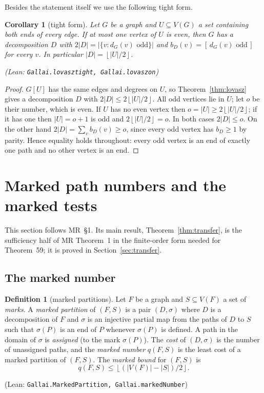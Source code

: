 \documentclass[11pt]{amsart}
\newtheorem{corollary}[theorem]{Corollary}
\theoremstyle{definition}
\newtheorem{definition}[theorem]{Definition}
\theoremstyle{remark}
\renewcommand{\_}{\oldunderscore\allowbreak}
\newcommand{\leanst}[1]{\par{\raggedright\small\textup{(Lean: \texttt{#1})}\par}}
\newcommand{\fl}[1]{\left\lfloor #1\right\rfloor}
\newcommand{\ind}[1]{[\,#1\,]}
\begin{document}
Besides the statement itself we use the following tight form.

\begin{corollary}[tight form]\label{cor:lovasz}
Let $G$ be a graph and $U\subseteq V(G)$ a set containing both ends of every edge. If at most one
vertex of $U$ is even, then $G$ has a decomposition $D$ with $2|D|=|\{v:d_G(v)\text{ odd}\}|$ and
$b_D(v)=\ind{d_G(v)\text{ odd}}$ for every $v$. In particular $|D|=\fl{|U|/2}$.
\leanst{Gallai.lovasz\_tight, Gallai.lovasz\_on}
\end{corollary}

\begin{proof}
$G[U]$ has the same edges and degrees on $U$, so Theorem~\ref{thm:lovasz} gives a decomposition $D$
with $2|D|\le 2\fl{|U|/2}$. All odd vertices lie in $U$; let $o$ be their number, which is even. If
$U$ has no even vertex then $o=|U|\ge 2\fl{|U|/2}$; if it has one then $|U|=o+1$ is odd and
$2\fl{|U|/2}=o$. In both cases $2|D|\le o$. On the other hand $2|D|=\sum_v b_D(v)\ge o$, since every
odd vertex has $b_D\ge1$ by parity. Hence equality holds throughout: every odd vertex is an end of
exactly one path and no other vertex is an end.
\end{proof}

\section{Marked path numbers and the marked tests}\label{sec:marked}

This section follows MR~\S1. Its main result, Theorem~\ref{thm:transfer}, is the sufficiency half
of MR Theorem~1 in the finite-order form needed for Theorem~59; it is proved in
Section~\ref{sec:transfer}.

\subsection{The marked number}

\begin{definition}[marked partitions]\label{def:marked}
Let $F$ be a graph and $S\subseteq V(F)$ a set of \emph{marks}. A \emph{marked partition} of
$(F,S)$ is a pair $(D,\sigma)$ where $D$ is a decomposition of $F$ and $\sigma$ is an injective
partial map from the paths of $D$ to $S$ such that $\sigma(P)$ is an end of $P$ whenever $\sigma(P)$
is defined. A path in the domain of $\sigma$ is \emph{assigned} (to the mark $\sigma(P)$). The
\emph{cost} of $(D,\sigma)$ is the number of unassigned paths, and the \emph{marked number}
$q(F,S)$ is the least cost of a marked partition of $(F,S)$. The \emph{marked bound} for $(F,S)$ is
\begin{equation}\label{eq:mb}
q(F,S)\le\fl{(|V(F)|-|S|)/2}.
\end{equation}
\leanst{Gallai.MarkedPartition, Gallai.markedNumber}
\end{definition}
\end{document}
